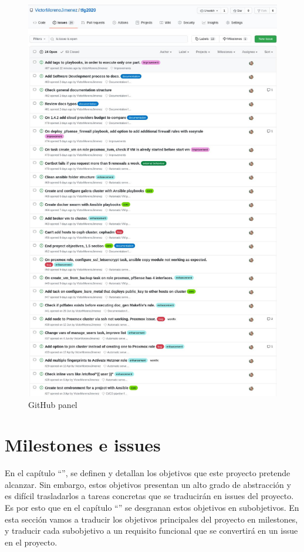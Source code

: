 \begin{text}
	
	\begin{figure}[!hbt]
		\centering
		\includegraphics[scale=0.46]{imagenes/Analisis/githubissues.jpg}
		\caption[GitHub panel]{GitHub panel \cite{githubrepo:online}}
		\label{github_issues}
	\end{figure}
\end{text}
\clearpage

\section{Milestones e issues}
\begin{text}
	En el capítulo ``'', se definen y detallan los objetivos que este proyecto pretende alcanzar. Sin embargo, estos objetivos presentan un alto grado de abstracción y es difícil trasladarlos a tareas concretas que se traducirán en issues del proyecto. Es por esto que en el capítulo ``'' se desgranan estos objetivos en subobjetivos. En esta sección vamos a traducir los objetivos principales del proyecto en milestones, y traducir cada subobjetivo a un requisito funcional que se convertirá en un issue en el proyecto.
\end{text}

